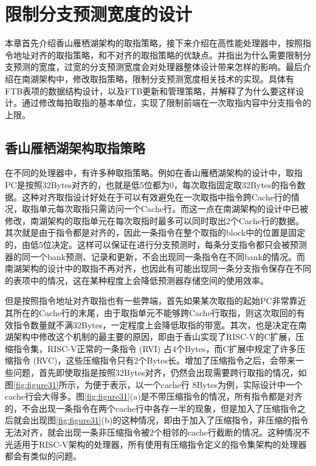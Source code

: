 \chapter{限制分支预测宽度的设计}

本章首先介绍香山雁栖湖架构的取指策略，接下来介绍在高性能处理器中，按照指令地址对齐的取指策略，和不对齐的取指策略的优缺点。并指出为什么需要限制分支预测的宽度，过宽的分支预测宽度会对处理器整体设计带来怎样的影响。最后介绍在南湖架构中，修改取指策略，限制分支预测宽度相关技术的实现。具体有FTB表项的数据结构设计，以及FTB更新和管理策略，并解释了为什么要这样设计。通过修改每拍取指的基本单位，实现了限制前端在一次取指内容中分支指令的上限。

\section{香山雁栖湖架构取指策略}

在不同的处理器中，有许多种取指策略。例如在香山雁栖湖架构的设计中，取指PC是按照32Bytes对齐的，也就是低5位都为0，每次取指固定取32Bytes的指令数据。这种对齐取指设计好处在于可以有效避免在一次取指中指令跨Cache行的情况，取指单元每次取指只需访问一个Cache行。而这一点在南湖架构的设计中已被修改，南湖架构的取指单元在每次取指时最多可以同时取出2个Cache行的数据。其次就是由于指令都是对齐的，因此一条指令在整个取指的block中的位置是固定的，由低5位决定。这样可以保证在进行分支预测时，每条分支指令都只会被预测器的同一个bank预测、记录和更新，不会出现同一条指令在不同bank的情况。而南湖架构的设计中的取指不再对齐，也因此有可能出现同一条分支指令保存在不同的表项中的情况，这在某种程度上会降低预测器存储空间的使用效率。

但是按照指令地址对齐取指也有一些弊端，首先如果某次取指的起始PC非常靠近其所在的Cache行的末尾，由于取指单元不能够跨Cache行取指，则这次取回的有效指令数量就不满32Bytes，一定程度上会降低取指的带宽。其次，也是决定在南湖架构中修改这个机制的最主要的原因，即由于香山实现了RISC-V的C扩展，压缩指令集，RISC-V正常的一条指令 (RVI) 占4个Bytes，而C扩展中规定了许多压缩指令 (RVC)，这些压缩指令只有2个Bytes长。增加了压缩指令之后，会带来一些问题，首先即使取指是按照32Bytes对齐，仍然会出现需要跨行取指的情况，如图\ref{fig:figure31}所示，为便于表示，以一个cache行 8Bytes为例，实际设计中一个cache行会大得多。图\ref{fig:figure31}(a)是不带压缩指令的情况，所有指令都是对齐的，不会出现一条指令在两个cache行中各存一半的现象，但是加入了压缩指令之后就会出现图\ref{fig:figure31}(b)的这种情况，即由于加入了压缩指令，非压缩的指令无法对齐，就会出现一条非压缩指令被2个相邻的cache行截断的情况。这种情况不光适用于RISC-V架构的处理器，所有使用有压缩指令定义的指令集架构的处理器都会有类似的问题。

